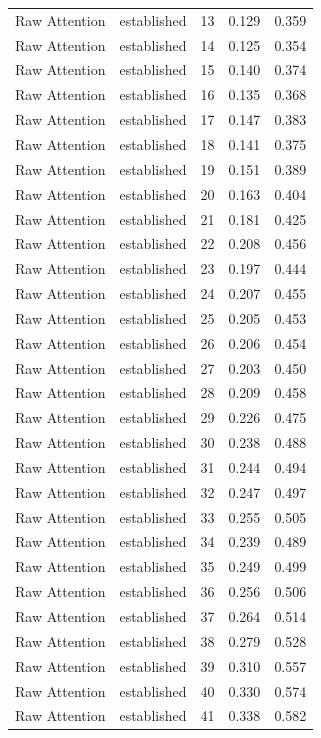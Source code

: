\begin{tabular}{llrrr}
Raw Attention & established & 13 & 0.129 & 0.359 \\
Raw Attention & established & 14 & 0.125 & 0.354 \\
Raw Attention & established & 15 & 0.140 & 0.374 \\
Raw Attention & established & 16 & 0.135 & 0.368 \\
Raw Attention & established & 17 & 0.147 & 0.383 \\
Raw Attention & established & 18 & 0.141 & 0.375 \\
Raw Attention & established & 19 & 0.151 & 0.389 \\
Raw Attention & established & 20 & 0.163 & 0.404 \\
Raw Attention & established & 21 & 0.181 & 0.425 \\
Raw Attention & established & 22 & 0.208 & 0.456 \\
Raw Attention & established & 23 & 0.197 & 0.444 \\
Raw Attention & established & 24 & 0.207 & 0.455 \\
Raw Attention & established & 25 & 0.205 & 0.453 \\
Raw Attention & established & 26 & 0.206 & 0.454 \\
Raw Attention & established & 27 & 0.203 & 0.450 \\
Raw Attention & established & 28 & 0.209 & 0.458 \\
Raw Attention & established & 29 & 0.226 & 0.475 \\
Raw Attention & established & 30 & 0.238 & 0.488 \\
Raw Attention & established & 31 & 0.244 & 0.494 \\
Raw Attention & established & 32 & 0.247 & 0.497 \\
Raw Attention & established & 33 & 0.255 & 0.505 \\
Raw Attention & established & 34 & 0.239 & 0.489 \\
Raw Attention & established & 35 & 0.249 & 0.499 \\
Raw Attention & established & 36 & 0.256 & 0.506 \\
Raw Attention & established & 37 & 0.264 & 0.514 \\
Raw Attention & established & 38 & 0.279 & 0.528 \\
Raw Attention & established & 39 & 0.310 & 0.557 \\
Raw Attention & established & 40 & 0.330 & 0.574 \\
Raw Attention & established & 41 & 0.338 & 0.582 \\

\end{tabular}
